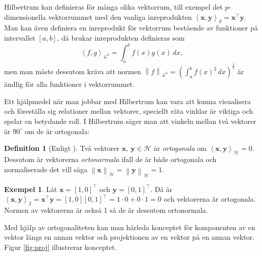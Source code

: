 \documentclass[a4paper, 12pt]{report}
\theoremstyle{definition}
\newtheorem{defi}{Definition}[section]
\newtheorem{ex}{Exempel}[section]
\theoremstyle{remark}
\newcommand{\bfx}{\mathbf{x}}
\newcommand{\bfy}{\mathbf{y}}
\newcommand{\llangle}{\left\langle}
\newcommand{\rrangle}{\right\rangle}
\newcommand{\inner}[2]{\llangle #1, #2 \rrangle}
\newcommand{\hil}{\mathcal{H}}
\begin{document}
Hilbertrum kan definieras för många olika vektorrum, till exempel det $p$-dimensionella vektorrummet med den vanliga inreprodukten $\left\langle \mathbf{x}, \mathbf{y} \right\rangle_d = \mathbf{x}^\intercal\mathbf{y}$.
Man kan även definiera en inreprodukt för vektorrum bestående av funktioner på intervallet $\left[a, b\right]$, då brukar inreprodukten definieras som
\begin{equation*}
\left\langle f, g\right\rangle_{\mathcal{L}^2}=\int_{a}^{b}f\left(x\right)g\left(x\right) \, dx ,
\end{equation*}
men man måste dessutom kräva att normen $\left\|f\right\|_{\mathcal{L}^2} = \left(\int_{a}^{b}f\left(x\right)^2\,dx\right)^{\frac{1}{2}}$ är ändlig för alla funktioner i vektorrummet.

Ett hjälpmedel när man jobbar med Hilbertrum kan vara att kunna visualisera och föreställa sig relationer mellan vektorer, speciellt räta vinklar är viktiga och spelar en betydande roll. I Hilbertrum säger man att vinkeln mellan två vektorer är $90^\circ$ om de är ortogonala:


\begin{defi}[Enligt \cite{Lang}]
	Två vektorer $\bfx, ~\bfy\in\hil$ är \emph{ortogonala} om $\inner{\bfx}{\bfy}_\hil=0$. Dessutom är vektorerna \emph{ortonormala} ifall de är både ortogonala och normaliserade det vill säga $\left\|\bfx\right\|_\hil=\left\|\bfy\right\|_\hil=1$.
\end{defi}
\begin{ex}%
	Låt $\bfx=\left[1, 0\right]^\intercal$ och $\bfy=\left[0, 1\right]^\intercal$. Då är $\inner{\bfx}{\bfy}_2=\bfx^\intercal\bfy=\left[1, 0\right]\left[0, 1\right]^\intercal = 1\cdot0 + 0\cdot1=0$ och vektorerna är ortogonala. Normen av vektorerna är också 1 så de är dessutom ortonormala.
\end{ex}

Med hjälp av ortogonaliteten kan man härleda konceptet för komponenten av en vektor längs en annan vektor och projektionen av en vektor på en annan vektor.
Figur \ref{fig:proj} illustrerar konceptet.
\end{document}
